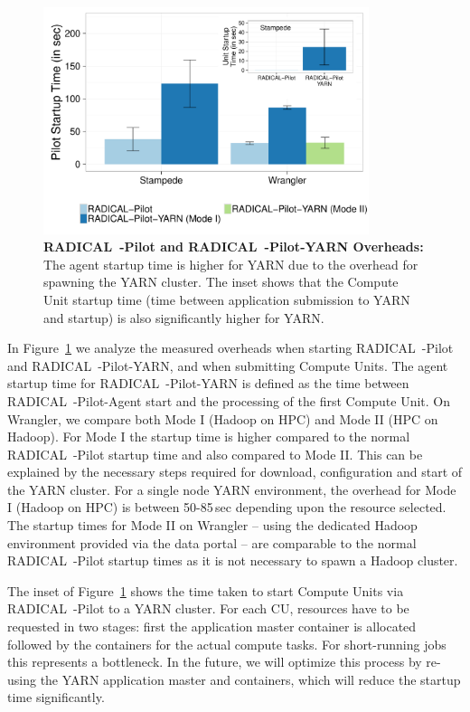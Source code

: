 \begin{figure}
    \centering
    \includegraphics[width=0.85\textwidth]{figures/data_analytics_hpc/hpc_hadoop/pilot_unit_startup.pdf}
    \caption{\textbf{RADICAL~-Pilot and RADICAL~-Pilot-YARN Overheads:}
        The agent startup time is higher for YARN due to the overhead for spawning the YARN cluster.
        The inset shows that the Compute Unit startup time (time between application submission to YARN and startup) is also significantly higher for YARN.
        \label{fig:startup_yarn}}
\end{figure}

In Figure~\ref{fig:startup_yarn} we analyze the measured overheads when starting RADICAL~-Pilot and RADICAL~-Pilot-YARN, and when submitting Compute Units.
The agent startup time for RADICAL~-Pilot-YARN is defined as the time between RADICAL~-Pilot-Agent start and the processing of the first Compute Unit.
On Wrangler, we compare both Mode I (Hadoop on HPC) and Mode II (HPC on Hadoop).
For Mode I the startup time is higher compared to the normal RADICAL~-Pilot startup time and also compared to Mode II.
This can be explained by the necessary steps required for download, configuration and start of the YARN cluster.
For a single node YARN environment, the overhead for Mode I (Hadoop on HPC) is between 50-85\,sec depending upon the resource selected.
The startup times for Mode II on Wrangler -- using the dedicated Hadoop environment provided via the data portal -- are comparable to the normal RADICAL~-Pilot startup times as it is not necessary to spawn a Hadoop cluster.

The inset of Figure~\ref{fig:startup_yarn} shows the time taken to start Compute Units via RADICAL~-Pilot to a YARN cluster.
For each CU, resources have to be requested in two stages: first the application master container is allocated followed by the containers for the actual compute tasks.
For short-running jobs this represents a bottleneck.
In the future, we will optimize this process by re-using the YARN application master and containers, which will reduce the startup time significantly.

